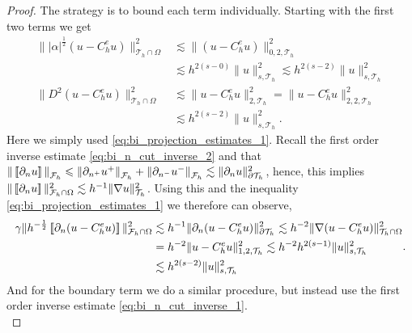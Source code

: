 \begin{proof}
    The strategy is to bound each term individually.
             Starting with the first two terms we get
    \[
        \begin{split}
            \| |\alpha |^{\frac{1}{2}} ( u - C_{h}^{e}u) \|_{ \mathcal{T} _{h} \cap \Omega  }^{ 2}    & \lesssim \|  ( u - C_{h}^{e}u) \|_{0,2,\mathcal{T} _{h}  }^{ 2} \\
             &    \lesssim  h^{2(s-0)}    \| u \|_{s,\mathcal{T}_{h} }^{  2}\lesssim  h^{2(s-2)}    \| u \|_{s,\mathcal{T}_{h} }^{  2} \\
            \| D^2 ( u - C_{h}^{e}u ) \|_{\mathcal{T} _{h} \cap \Omega   }^{ 2 } &  \lesssim  \|  u - C_{h}^{e}u  \|_{2,\mathcal{T} _{h}   }^{ 2 }   =  \|  u - C_{h}^{e}u  \|_{2,2,\mathcal{T} _{h}   }^{ 2 } \\
                                                                                 & \lesssim  h^{2(s-2)} \| u \|_{ s, \mathcal{T}_{h}}^{ 2 }.
        \end{split}
    \]
    Here we simply used \eqref{eq:bi_projection_estimates_1}.
    Recall the first order inverse estimate \eqref{eq:bi_n_cut_inverse_2} and that $\| \left[\!\left[  \partial _{n} u  \right]\!\right]   \|_{ \mathcal{F} _{h} }^{  } \leqslant \| \partial _{n^{+}} u^{+}   \|_{ \mathcal{F} _{h} }^{  } +
    \|\partial _{n^{-}} u^{-}   \|_{ \mathcal{F} _{h} }^{  } \lesssim  \|\partial _{n} u \|_{ \partial\mathcal{T }_{h}  }^{2  }  $, hence, this implies $\| \left[\!\left[  \partial _{n} u  \right]\!\right]   \|_{   \mathcal{F}_{h}\cap \Omega    }^{2} \lesssim h^{-1} \| \nabla u \|_{ \mathcal{T}
        _{h} }^{2  }  $. Using this and the inequality \eqref{eq:bi_projection_estimates_1} we therefore can observe, \[
        \begin{split}
            \gamma \| h^{-\frac{1}{2}} \left[\!\left[  \partial _{n} ( u - C_{h}^{e}u )  \right]\!\right]   \|_{ \mathcal{F}_{h} \cap \Omega   }^{  2}   & \lesssim
            h^{-1} \|   \partial _{n} ( u - C_{h}^{e}u )    \|_{  \partial \mathcal{T} _{h} }^{2  } \lesssim  h^{-2} \|   \nabla  ( u - C_{h}^{e}u )    \|_{ \mathcal{T} _{h}\cap \Omega  }^{2  }\\
&=  h^{-2} \|    u - C_{h}^{e}u     \|_{ 1,2,\mathcal{T} _{h} }^{2  } \lesssim  h^{ -2 } h^{ 2(s - 1)  } \| u \|_{ s, \mathcal{T}_{h}   }^{  2} \\
& \lesssim   h^{ 2(s - 2)  } \| u \|_{ s, \mathcal{T}_{h}   }^{  2} \\
        \end{split}
        .
    \]
    And for the boundary term we do a similar procedure, but instead use the first order inverse estimate \eqref{eq:bi_n_cut_inverse_1}. \[
\]
\end{proof}
